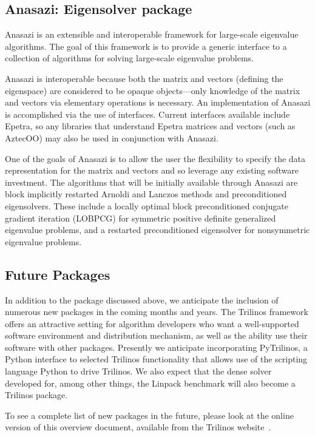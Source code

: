\documentclass[12pt,relax]{TrilinosOverview}
\begin{document}
\subsection{Anasazi: Eigensolver package}


Anasazi is an extensible and interoperable framework for 
large-scale eigenvalue algorithms.  The goal of this 
framework is to provide a generic interface to a collection 
of algorithms for solving large-scale eigenvalue problems. 

Anasazi is interoperable because both the matrix and vectors (defining the
eigenspace) are considered to be opaque objects---only knowledge of the matrix and
vectors via elementary operations is necessary. An implementation of Anasazi
is accomplished via the use of interfaces. Current interfaces available include
Epetra, so any libraries that understand Epetra matrices and vectors (such
as AztecOO) may also be used in conjunction with Anasazi.

One of the goals of Anasazi is to allow the user the flexibility 
to specify the data representation for the matrix and vectors and 
so leverage any existing software
investment. The algorithms that will be initially available through 
Anasazi are block implicitly restarted Arnoldi and Lanczos methods 
and preconditioned eigensolvers.
These include a locally optimal block preconditioned conjugate 
gradient iteration  (LOBPCG) for symmetric positive definite 
generalized eigenvalue problems, and a 
restarted preconditioned eigensolver for nonsymmetric eigenvalue problems.


\subsection{Future Packages}

In addition to the package discussed above, we anticipate the
inclusion of numerous new packages in the coming months and years.
The Trilinos framework offers an attractive setting for algorithm
developers who want a well-supported software environment and
distribution mechanism, as well as the ability use their software with
other packages.  Presently we anticipate incorporating PyTrilinos, a
Python interface to selected Trilinos functionality that allows use of
the scripting language Python to drive Trilinos.  We also expect that
the dense solver developed for, among other things, the Linpack
benchmark will also become a Trilinos package.

To see a complete list of new packages in the future, please look at
the online version of this overview document, available from the
Trilinos website~\cite{Trilinos-home-page}.
\end{document}
